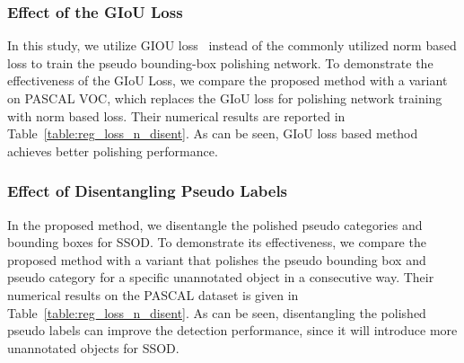 \documentclass[letterpaper]{article} \usepackage{aaai23}  \usepackage{times}  \usepackage{helvet}  \usepackage{courier}  \usepackage[hyphens]{url}  \usepackage{graphicx} \urlstyle{rm} \def\UrlFont{\rm}  \usepackage{natbib}  \usepackage{caption} \frenchspacing  \setlength{\pdfpagewidth}{8.5in}  \setlength{\pdfpageheight}{11in}  \usepackage{algorithm}
\begin{document}
\subsubsection{\textbf{Effect of the GIoU Loss}}
In this study, we utilize GIOU loss~\cite{Rezatofighi_2019_CVPR} instead of the commonly utilized  norm based loss to train the pseudo bounding-box polishing network. To demonstrate the effectiveness of the GIoU Loss, we compare the proposed method with a variant on PASCAL VOC, which replaces the GIoU loss for polishing network training with  norm based loss. Their numerical results are reported in Table~\ref{table:reg_loss_n_disent}. As can be seen, GIoU loss based method achieves better polishing performance.


\subsubsection{\textbf{Effect of Disentangling Pseudo Labels}}
In the proposed method, we disentangle the polished pseudo categories and bounding boxes for SSOD. To demonstrate its effectiveness, we compare the proposed method with a variant that polishes the pseudo bounding box and pseudo category for a specific unannotated object in a consecutive way. Their numerical results on the PASCAL dataset is given in Table~\ref{table:reg_loss_n_disent}. As can be seen, disentangling the polished pseudo labels can improve the detection performance, since it will introduce more unannotated objects for SSOD.
\end{document}
